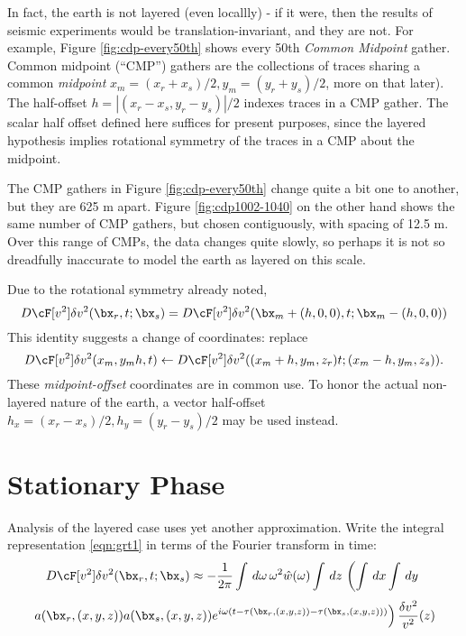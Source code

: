 In fact, the earth is not layered (even locallly) - if it were, then the results of seismic experiments would be translation-invariant, and they are not. For example, Figure \ref{fig:cdp-every50th} shows every 50th {\em Common Midpoint} gather. Common midpoint (``CMP'') gathers are the collections of traces sharing a common {\em midpoint} $x_m=(x_r+x_s)/2, y_m=(y_r+y_s)/2$, more on that later).
The half-offset $h=|(x_r-x_s,y_r-y_s)|/2$ indexes traces in a CMP gather. The scalar half offset defined here suffices for present purposes, since the layered hypothesis implies rotational symmetry of the traces in a CMP about the midpoint.

The CMP gathers in Figure \ref{fig:cdp-every50th} change quite a bit one to another, but they are 625 m apart. Figure \ref{fig:cdp1002-1040} on the other hand shows the same number of CMP gathers, but chosen contiguously, with spacing of 12.5 m. Over this range of CMPs, the data changes quite slowly, so perhaps it is not so dreadfully inaccurate to model the earth as layered on this scale.



Due to the rotational symmetry already noted,
\begin{equation}
\label{eqn:cmpdf}
D\cF[v^2]\delta v^2(\bx_r,t;\bx_s) = D\cF[v^2]\delta v^2(\bx_m + (h,0,0),t; \bx_m-(h,0,0))
\end{equation}
This identity suggests a change of coordinates: replace
\begin{equation}
\label{eqn:cmpdfc}
D\cF[v^2]\delta v^2(x_m,y_mh,t) \leftarrow D\cF[v^2]\delta v^2((x_m + h,y_m,z_r)t; (x_m-h,y_m,z_s)).
\end{equation}
These {\em midpoint-offset} coordinates are in common use. To honor the actual non-layered nature of the earth, a vector half-offset $h_x = (x_r-x_s)/2, h_y=(y_r-y_s)/2$ may be used instead.

\section{Stationary Phase}
Analysis of the layered case uses yet another approximation. Write the integral representation \ref{eqn:grt1} in terms of the Fourier transform in time: 
\[
D\cF[v^2]\delta v^2(\bx_r,t;\bx_s) \approx -\frac{1}{2\pi}\int\, d\omega \,\omega^2\hat{w}(\omega)\int \,dz \,\left( \int\,dx\int\,dy \, \right.
\]
\begin{equation}
\label{eqn:grt2}
\left. a(\bx_r,(x,y,z))a(\bx_s,(x,y,z))e^{i\omega(t-\tau(\bx_r,(x,y,z))-\tau(\bx_s,(x,y,z)))}\right)\frac{\delta v^2}{v^2}(z)
\end{equation}

